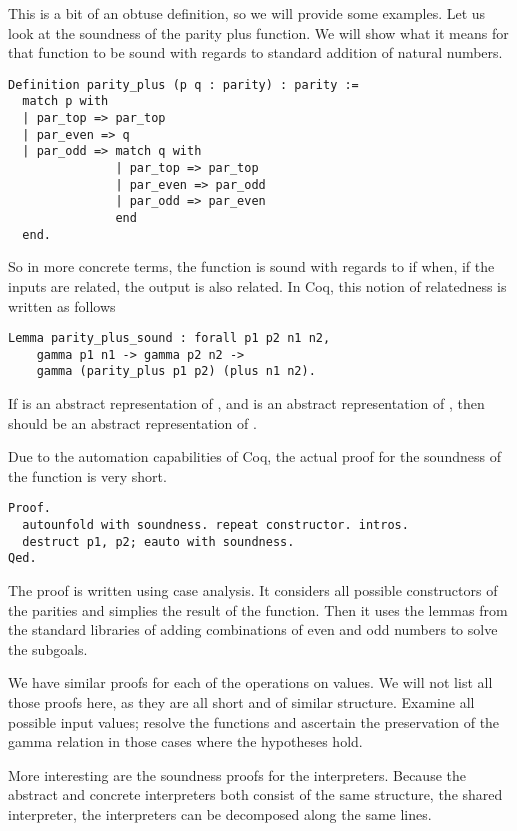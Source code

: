 This is a bit of an obtuse definition, so we will provide some examples. Let us
look at the soundness of the parity plus function. We will show what it
means for that function to be sound with regards to standard addition of
natural numbers.

\begin{verbatim}
Definition parity_plus (p q : parity) : parity :=
  match p with 
  | par_top => par_top
  | par_even => q
  | par_odd => match q with
               | par_top => par_top
               | par_even => par_odd
               | par_odd => par_even
               end
  end.
\end{verbatim}

So in more concrete terms, the function  is sound with 
regards to 
if when, if the inputs are related, the output is also related. In Coq, this 
notion of relatedness is written as follows

\begin{verbatim}
Lemma parity_plus_sound : forall p1 p2 n1 n2, 
    gamma p1 n1 -> gamma p2 n2 -> 
    gamma (parity_plus p1 p2) (plus n1 n2).
\end{verbatim}

If  is an abstract representation of , and  is an 
abstract representation of , then  should be an 
abstract representation of . 

Due to the automation capabilities of Coq, the actual proof for the soundness
of the  function is very short.

\begin{verbatim}
Proof. 
  autounfold with soundness. repeat constructor. intros.
  destruct p1, p2; eauto with soundness.
Qed.
\end{verbatim}

The proof is written using case analysis. It considers all possible
constructors of the parities and simplies the result of the 
function. Then it uses the lemmas from the standard libraries of adding 
combinations of even and odd numbers to solve the subgoals.

We have similar proofs for each of the operations on values. We will not list
all those proofs here, as they are all short and of similar structure. Examine
all possible input values; resolve the functions and ascertain the preservation
of the gamma relation in those cases where the hypotheses hold.

More interesting are the soundness proofs for the interpreters. Because the
abstract and concrete interpreters both consist of the same structure, the
shared interpreter, the interpreters can be decomposed along the same lines.

